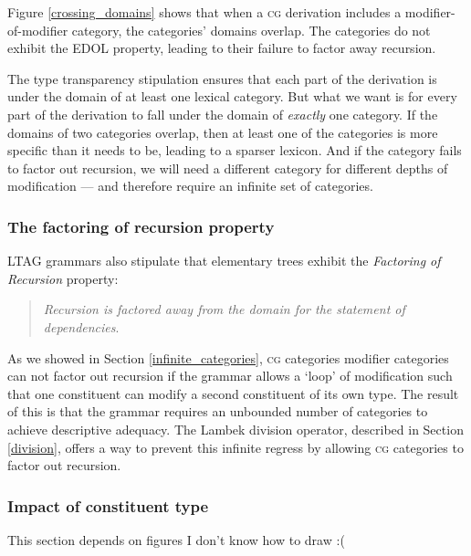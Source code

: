 \documentclass[11pt,twoside,final]{ahudson-harvard}
\newcommand{\cg}{\textsc{cg}\xspace}
\newcommand{\term}[1]{\emph{#1}}
\begin{document}
Figure \ref{crossing_domains} shows that when a \cg derivation includes a modifier-of-modifier category, the categories' domains overlap. The categories do not exhibit the EDOL property, leading to their failure to factor away recursion.

The type transparency stipulation ensures that each part of the derivation is under the domain of at least one lexical category. But what we want is for every part of the derivation to fall under the domain of \emph{exactly} one category. If the domains of two categories overlap, then at least one of the categories is more specific than it needs to be, leading to a sparser lexicon. And if the category fails to factor out recursion, we will need a different category for different depths of modification --- and therefore require an infinite set of categories.

\subsubsection{The factoring of recursion property}

LTAG grammars also stipulate that elementary trees exhibit the \term{Factoring of Recursion} property:

\begin{quote}
\emph{Recursion is factored away from the domain for the statement of dependencies}.
\end{quote}

As we showed in Section \ref{infinite_categories}, \cg categories modifier categories can not factor out recursion if the grammar allows a `loop' of modification such that one constituent can modify a second constituent of its own type. The result of this is that the grammar requires an unbounded number of categories to achieve descriptive adequacy. The Lambek division operator, described in Section \ref{division}, offers a way to prevent this infinite regress by allowing \cg categories to factor out recursion.

\subsubsection{Impact of constituent type}

This section depends on figures I don't know how to draw :(

\end{document}
